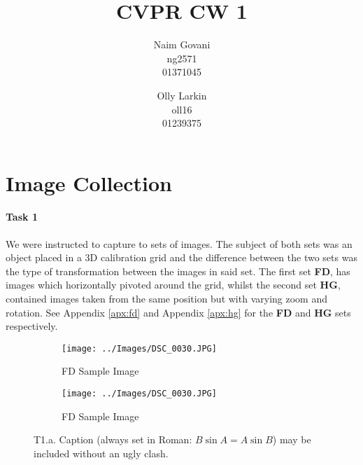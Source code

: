 \documentclass[10pt,twocolumn,letterpaper]{article}
\begin{document}
\title{CVPR CW 1}

\author{Naim Govani\\
ng2571\\
01371045\\
\and
Olly Larkin\\
oll16\\
01239375\\
}

\maketitle

\section{Image Collection}

\paragraph{Task 1} We were instructed to capture to sets of images. The subject of both sets was an object placed in a 3D calibration grid and the difference between the two sets was the type of transformation between the images in said set. The first set \textbf{FD}, has images which horizontally pivoted around the grid, whilst the second set \textbf{HG}, contained images taken from the same position but with varying zoom and rotation. See Appendix \ref{apx:fd} and Appendix \ref{apx:hg} for the \textbf{FD} and \textbf{HG} sets respectively.

\begin{figure}[ht]
\begin{center}
   \begin{subfigure}{0.49\linewidth}
   \centering
   \texttt{[image: ../Images/DSC\_0030.JPG]}
   \caption{FD Sample Image}
   \label{fd:subfig:1}
   \end{subfigure}
   \begin{subfigure}{0.49\linewidth}
   \centering
   \texttt{[image: ../Images/DSC\_0030.JPG]}
   \caption{FD Sample Image}
   \label{fd:subfig:2}
   \end{subfigure}
\end{center}
   \caption{T1.a. Caption 
   (always set in Roman: $B \sin A = A \sin B$) may be included without an
   ugly clash.}
\label{fig:1}
\end{figure}
\end{document}
